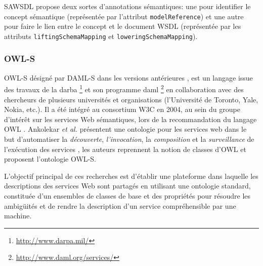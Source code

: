 	    \textsc{SAWSDL} propose deux sortes d'annotations sémantiques: une pour identifier le
	    concept sémantique (représentée par l'attribut \texttt{modelReference}) et une autre pour faire
	    le lien entre le concept et le document \textsc{WSDL} (représentée par les attributs 
	    \texttt{liftingSchemaMapping} et \texttt{loweringSchemaMapping}).


	    \subsubsection{OWL-S}

	    \textsc{OWL-S} \cite{martin2004owl} désigné par \textsc{DAML-S} dans les versions antérieures
	    \cite{ankolekar2002daml}, est un langage issue des travaux de la \acrshort{darba}
	    \footnote{\url{http://www.darpa.mil/}} et son programme \acrshort{daml}
	    \footnote{\url{http://www.daml.org/services/}} en collaboration avec des chercheurs de plusieurs 
	    universités et organisations (l'Université de Toronto, Yale, Nokia, etc.). Il a été intégré au consortium 
	    \textsc{W3C} en 2004, au sein du groupe d'intérêt sur les services Web sémantiques, lors de la 
	    recommandation du langage \textsc{OWL} \cite{horrocks2002daml+oil} \cite{mcguinness2004owl}. 
	    Ankolekar \emph{et al.} \cite{ankolekar2002daml} présentent une ontologie pour les services web dans 
	    le but d'automatiser la \emph{découverte}, \emph{l'invocation}, la \emph{composition} et la
	    \emph{surveillance} de l'exécution des services \cite{mcilraith2003bringing}, les auteurs reprennent 
	    la notion de classes d'\textsc{OWL} et proposent l'ontologie \textsc{OWL-S}.


	    L'objectif principal de ces recherches est d'établir une plateforme dans laquelle les descriptions des
	    services Web sont partagés en utilisant une ontologie standard, constituée d'un ensembles de classes de
	    base et des propriétés pour résoudre les ambigüités et de rendre la description d'un service 
	    compréhensible par une machine.


